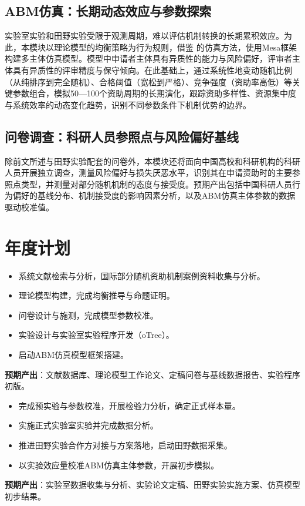 \subsection{\textbf{ ABM仿真：长期动态效应与参数探索}}
实验室实验和田野实验受限于观测周期，难以评估机制转换的长期累积效应。为此，本模块以理论模型的均衡策略为行为规则，借鉴 \cite{hoylaConsequencesCompetitionSimulating2016}的仿真方法，使用Mesa框架构建多主体仿真模型。模型中申请者主体具有异质性的能力与风险偏好，评审者主体具有异质性的评审精度与保守倾向。在此基础上，通过系统性地变动随机比例（从纯排序到完全随机）、合格阈值（宽松到严格）、竞争强度（资助率高低）等关键参数组合，模拟50—100个资助周期的长期演化，跟踪资助多样性、资源集中度与系统效率的动态变化趋势，识别不同参数条件下机制优势的边界。

\subsection{\textbf{问卷调查：科研人员参照点与风险偏好基线}}
除前文所述与田野实验配套的问卷外，本模块还将面向中国高校和科研机构的科研人员开展独立调查，测量风险偏好与损失厌恶水平，识别其在申请资助时的主要参照点类型，并测量对部分随机机制的态度与接受度。预期产出包括中国科研人员行为偏好的基线分布、机制接受度的影响因素分析，以及ABM仿真主体参数的数据驱动校准值。


\section{\textbf{年度计划}}

\noindent\textbf{}
\begin{itemize}
\item 系统文献检索与分析，国际部分随机资助机制案例资料收集与分析。
\item 理论模型构建，完成均衡推导与命题证明。
\item 问卷设计与施测，完成模型参数校准。
\item 实验设计与实验室实验程序开发（oTree）。
\item 启动ABM仿真模型框架搭建。
\end{itemize}
\noindent\textbf{预期产出}：文献数据库、理论模型工作论文、定稿问卷与基线数据报告、实验程序初版。

\noindent\textbf{}
\begin{itemize}
\item 完成预实验与参数校准，开展检验力分析，确定正式样本量。
\item 实施正式实验室实验并完成数据分析。
\item 推进田野实验合作方对接与方案落地，启动田野数据采集。
\item 以实验效应量校准ABM仿真主体参数，开展初步模拟。
\end{itemize}
\noindent\textbf{预期产出}：实验室数据收集与分析、实验论文定稿、田野实验实施方案、仿真模型初步结果。

